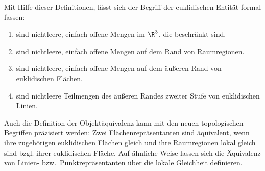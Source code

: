 %     
%     
%     
%     
%     
%     
%
    Mit
    Hilfe dieser Definitionen, lässt sich der Begriff der euklidischen Entität formal fassen:
    \begin{enumerate}
        \item {} sind nichtleere, einfach offene Mengen im $\R^3$, die beschränkt sind.
        \item {} sind nichtleere, einfach offene Mengen auf dem Rand von Raumregionen.
        \item {} sind nichtleere, einfach offene Mengen auf dem äußeren Rand von euklidischen Flächen.
        \item {} sind nichtleere Teilmengen des äußeren Randes zweiter Stufe von euklidischen Linien.
    \end{enumerate}
    Auch
    die Definition der Objektäquivalenz kann mit den neuen topologischen Begriffen präzisiert werden:
    Zwei Flächenrepräsentanten sind äquivalent, wenn ihre zugehörigen euklidischen Flächen gleich und ihre Raumregionen lokal gleich sind bzgl. ihrer euklidischen Fläche. Auf ähnliche Weise lassen sich die Äquivalenz von Linien- bzw.\ Punktrepräsentanten über die lokale Gleichheit definieren.
    
